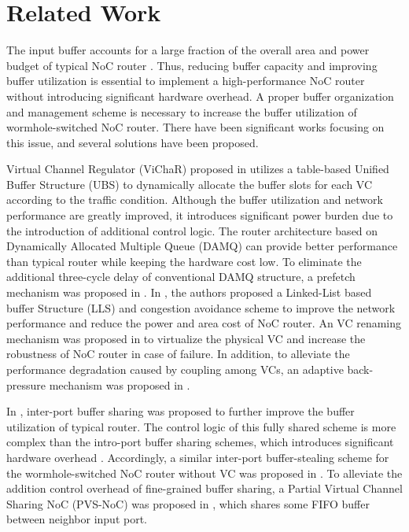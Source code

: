 \documentclass[paper]{ieice}
\begin{document}
\section{Related Work}\label{related}
The input buffer accounts for a large fraction of the overall area and power budget of typical NoC router \cite{1650108}\cite{ChPe03}. Thus, reducing buffer capacity and improving buffer utilization is essential to implement a high-performance NoC router without introducing significant hardware overhead. A proper buffer organization and management scheme is necessary to increase the buffer utilization of wormhole-switched NoC router. There have been significant works focusing on this issue, and several solutions have been proposed.

Virtual Channel Regulator (ViChaR) proposed in \cite{NPKV06} utilizes a table-based Unified Buffer Structure (UBS) to dynamically allocate the buffer slots for each VC according to the traffic condition. Although the buffer utilization and network performance are greatly improved, it introduces significant power burden due to the introduction of additional control logic. The router architecture based on Dynamically Allocated Multiple Queue (DAMQ) \cite{liu2006shared} can provide better performance than typical router while keeping the hardware cost low. To eliminate the additional three-cycle delay of conventional DAMQ structure, a prefetch mechanism was proposed in \cite{6310960}. In \cite{4555894}, the authors proposed a Linked-List based buffer Structure (LLS) and congestion avoidance scheme to improve the network performance and reduce the power and area cost of NoC router. An VC renaming mechanism was proposed in \cite{6296442} to virtualize the physical VC and increase the robustness of NoC router in case of failure. In addition, to alleviate the performance degradation caused by coupling among VCs, an adaptive back-pressure mechanism was proposed in \cite{BeckerJMD12}.

In \cite{Neishaburi:2009:RAN:1531542.1531658}\cite{5770788}, inter-port buffer sharing was proposed to further improve the buffer utilization of typical router. The control logic of this fully shared scheme is more complex than the intro-port buffer sharing schemes, which introduces significant hardware overhead \cite{Park2008}. Accordingly, a similar inter-port buffer-stealing scheme for the wormhole-switched NoC router without VC was proposed in \cite{5722177}. To alleviate the addition control overhead of fine-grained buffer sharing, a Partial Virtual Channel Sharing NoC (PVS-NoC) was proposed in \cite{5739053}, which shares some FIFO buffer between neighbor input port.
\end{document}
